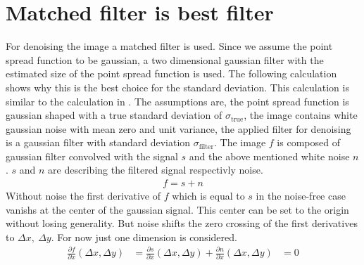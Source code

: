 


\section{Matched filter is best filter}
For denoising the image a matched filter is used. Since we assume the point spread function to be gaussian, a two dimensional gaussian filter with the estimated size of the point spread function is used. The following calculation shows why this is the best choice for the standard deviation.\newline
This calculation is similar to the calculation in \cite{ulli}. The assumptions are, the point spread function is gaussian shaped with a true standard deviation of $\sigma_\text{true}$, the image contains white gaussian noise with mean zero and unit variance, the applied filter for denoising is a gaussian filter with standard deviation $\sigma_\text{filter}$.\newline
The image $f$ is composed of gaussian filter convolved with the signal $s$ and the above mentioned white noise $n$. $s$ and $n$ are describing the filtered signal respectivly noise.
\begin{align}
 f=s+n \label{gl91}
\end{align}
Without noise the first derivative of $f$ which is equal to $s$ in the noise-free case vanishs at the center of the gaussian signal. This center can be set to the origin without losing generality. But noise shifts the zero crossing of the first derivatives to $\Delta x,~\Delta y$. For now just one dimension is considered.
\begin{align}
\frac{\partial f}{\partial x}\left(\Delta x, \Delta y\right) &= \frac{\partial s}{\partial x} \left(\Delta x, \Delta y\right) + \frac{\partial n}{\partial x}\left(\Delta x, \Delta y\right)&=0
\end{align}  

